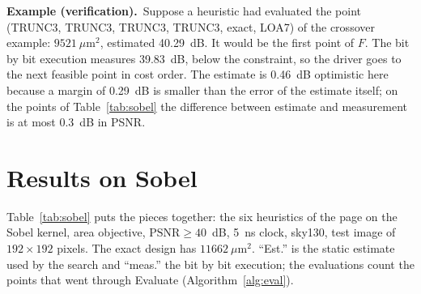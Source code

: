 \documentclass[11pt,a4paper]{article}
\newcommand{\examplebox}[2]{\par\medskip\noindent\colorbox{tabAzul!6}{\begin{minipage}{\dimexpr\linewidth-2\fboxsep}
  \textbf{Example (#1).}\ #2\end{minipage}}\par\medskip}
\begin{document}
\examplebox{verification}{Suppose a heuristic had evaluated the point (TRUNC3, TRUNC3, TRUNC3, TRUNC3, exact, LOA7) of
the crossover example: $9521\ \mu\text{m}^2$, estimated 40.29~dB. It would be the first point of $F$. The bit by bit
execution measures 39.83~dB, below the constraint, so the driver goes to the next feasible point in cost order. The
estimate is 0.46~dB optimistic here because a margin of 0.29~dB is smaller than the error of the estimate itself; on
the points of Table~\ref{tab:sobel} the difference between estimate and measurement is at most 0.3~dB in PSNR.}

\section{Results on Sobel}\label{sec:results}

Table~\ref{tab:sobel} puts the pieces together: the six heuristics of the page on the Sobel kernel, area objective,
$\text{PSNR} \ge 40$~dB, 5~ns clock, sky130, test image of $192 \times 192$ pixels. The exact design has
$11662\ \mu\text{m}^2$. ``Est.'' is the static estimate used by the search and ``meas.'' the bit by bit execution;
the evaluations count the points that went through Evaluate (Algorithm~\ref{alg:eval}).
\end{document}
